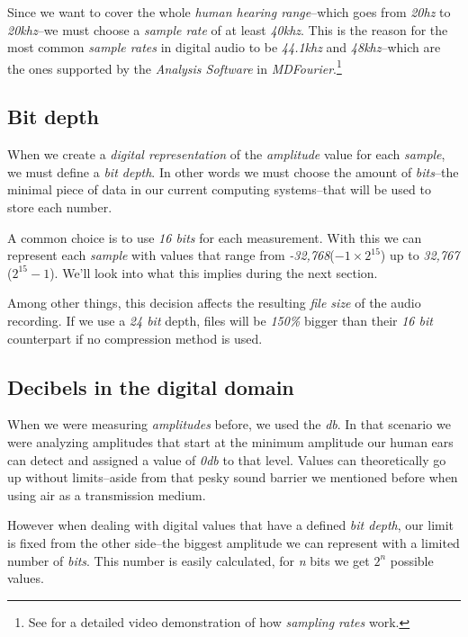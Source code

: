 \documentclass[10pt,a4paper]{report}
\newcommand{\ac}[1]{\textit{\mbox{\acrshort{#1}}}}
\newcommand{\hz}[1]{\textit{\mbox{#1\acrshort{hz}}}}
\newcommand{\khz}[1]{\textit{\mbox{#1\acrshort{khz}}}}
\newcommand{\dbSPL}[1]{\textit{\mbox{#1\acrshort{db}}}}
\begin{document}
Since we want to cover the whole \textit{human hearing range}--which goes from \hz{20} to \khz{20}--we must choose a \textit{sample rate} of at least \khz{40}. This is the reason for the most common \textit{sample rates} in digital audio to be \khz{44.1} and \khz{48}--which are the ones supported by the \textit{Analysis Software} in \textit{MDFourier}.\footnote{See \cite{MontyMontgomery} for a detailed video demonstration of how \textit{sampling rates} work.}


\subsection{Bit depth}

When we create a \textit{digital representation} of the \textit{amplitude} value for each \textit{sample}, we must define a \textit{bit depth}. In other words we must choose the amount of \textit{bits}--the minimal piece of data in our current computing systems--that will be used to store each number. 

A common choice is to use \textit{16 bits} for each measurement. With this we can represent each \textit{sample} with values that range from \textit{-32,768}($-1\times2^{15}$) up to \textit{32,767} ($2^{15}-1$). We'll look into what this implies during the next section.

Among other things, this decision affects the resulting \textit{file size} of the audio recording. If we use a \textit{24 bit} depth, files will be \textit{150\%} bigger than their \textit{16 bit} counterpart if no compression method is used.


\subsection{Decibels in the digital domain}

When we were measuring \textit{amplitudes} before, we used the \ac{db}. In that scenario we were analyzing amplitudes that start at the minimum amplitude our human ears can detect and assigned a value of \dbSPL{0} to that level. Values can theoretically go up without limits--aside from that pesky sound barrier we mentioned before when using air as a transmission medium.

However when dealing with digital values that have a defined \textit{bit depth}, our limit is fixed from the other side--the biggest amplitude we can represent with a limited number of \textit{bits}. This number is easily calculated, for \textit{n} bits we get $2^n$ possible values.
\end{document}
